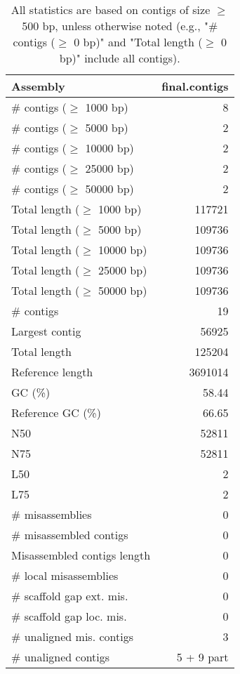 \documentclass[12pt,a4paper]{article}
\begin{document}
\begin{table}[ht]
\begin{center}
\caption{All statistics are based on contigs of size $\geq$ 500 bp, unless otherwise noted (e.g., "\# contigs ($\geq$ 0 bp)" and "Total length ($\geq$ 0 bp)" include all contigs).}
\begin{tabular}{|l*{1}{|r}|}
\hline
Assembly & final.contigs \\ \hline
\# contigs ($\geq$ 1000 bp) & 8 \\ \hline
\# contigs ($\geq$ 5000 bp) & 2 \\ \hline
\# contigs ($\geq$ 10000 bp) & 2 \\ \hline
\# contigs ($\geq$ 25000 bp) & 2 \\ \hline
\# contigs ($\geq$ 50000 bp) & 2 \\ \hline
Total length ($\geq$ 1000 bp) & 117721 \\ \hline
Total length ($\geq$ 5000 bp) & 109736 \\ \hline
Total length ($\geq$ 10000 bp) & 109736 \\ \hline
Total length ($\geq$ 25000 bp) & 109736 \\ \hline
Total length ($\geq$ 50000 bp) & 109736 \\ \hline
\# contigs & 19 \\ \hline
Largest contig & 56925 \\ \hline
Total length & 125204 \\ \hline
Reference length & 3691014 \\ \hline
GC (\%) & 58.44 \\ \hline
Reference GC (\%) & 66.65 \\ \hline
N50 & 52811 \\ \hline
N75 & 52811 \\ \hline
L50 & 2 \\ \hline
L75 & 2 \\ \hline
\# misassemblies & 0 \\ \hline
\# misassembled contigs & 0 \\ \hline
Misassembled contigs length & 0 \\ \hline
\# local misassemblies & 0 \\ \hline
\# scaffold gap ext. mis. & 0 \\ \hline
\# scaffold gap loc. mis. & 0 \\ \hline
\# unaligned mis. contigs & 3 \\ \hline
\# unaligned contigs & 5 + 9 part \\ \hline

\end{tabular}
\end{center}
\end{table}
\end{document}
